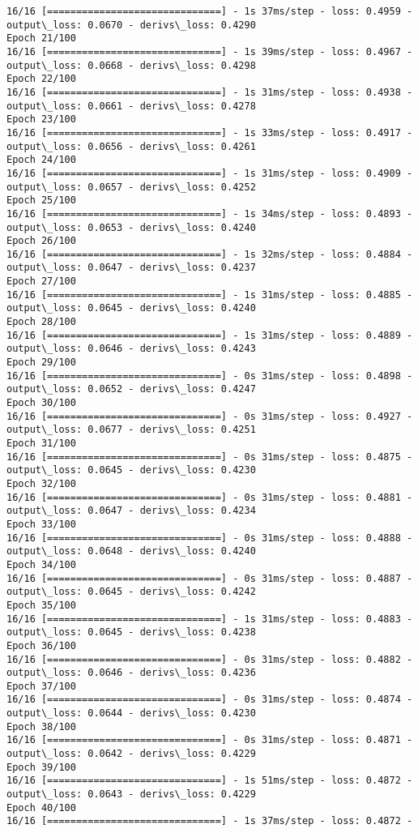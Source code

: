 \documentclass[11pt]{article}
\begin{document}
\begin{Verbatim}[commandchars=\\\{\}]
16/16 [==============================] - 1s 37ms/step - loss: 0.4959 -
output\_loss: 0.0670 - derivs\_loss: 0.4290
Epoch 21/100
16/16 [==============================] - 1s 39ms/step - loss: 0.4967 -
output\_loss: 0.0668 - derivs\_loss: 0.4298
Epoch 22/100
16/16 [==============================] - 1s 31ms/step - loss: 0.4938 -
output\_loss: 0.0661 - derivs\_loss: 0.4278
Epoch 23/100
16/16 [==============================] - 1s 33ms/step - loss: 0.4917 -
output\_loss: 0.0656 - derivs\_loss: 0.4261
Epoch 24/100
16/16 [==============================] - 1s 31ms/step - loss: 0.4909 -
output\_loss: 0.0657 - derivs\_loss: 0.4252
Epoch 25/100
16/16 [==============================] - 1s 34ms/step - loss: 0.4893 -
output\_loss: 0.0653 - derivs\_loss: 0.4240
Epoch 26/100
16/16 [==============================] - 1s 32ms/step - loss: 0.4884 -
output\_loss: 0.0647 - derivs\_loss: 0.4237
Epoch 27/100
16/16 [==============================] - 1s 31ms/step - loss: 0.4885 -
output\_loss: 0.0645 - derivs\_loss: 0.4240
Epoch 28/100
16/16 [==============================] - 1s 31ms/step - loss: 0.4889 -
output\_loss: 0.0646 - derivs\_loss: 0.4243
Epoch 29/100
16/16 [==============================] - 0s 31ms/step - loss: 0.4898 -
output\_loss: 0.0652 - derivs\_loss: 0.4247
Epoch 30/100
16/16 [==============================] - 0s 31ms/step - loss: 0.4927 -
output\_loss: 0.0677 - derivs\_loss: 0.4251
Epoch 31/100
16/16 [==============================] - 0s 31ms/step - loss: 0.4875 -
output\_loss: 0.0645 - derivs\_loss: 0.4230
Epoch 32/100
16/16 [==============================] - 0s 31ms/step - loss: 0.4881 -
output\_loss: 0.0647 - derivs\_loss: 0.4234
Epoch 33/100
16/16 [==============================] - 0s 31ms/step - loss: 0.4888 -
output\_loss: 0.0648 - derivs\_loss: 0.4240
Epoch 34/100
16/16 [==============================] - 0s 31ms/step - loss: 0.4887 -
output\_loss: 0.0645 - derivs\_loss: 0.4242
Epoch 35/100
16/16 [==============================] - 1s 31ms/step - loss: 0.4883 -
output\_loss: 0.0645 - derivs\_loss: 0.4238
Epoch 36/100
16/16 [==============================] - 0s 31ms/step - loss: 0.4882 -
output\_loss: 0.0646 - derivs\_loss: 0.4236
Epoch 37/100
16/16 [==============================] - 0s 31ms/step - loss: 0.4874 -
output\_loss: 0.0644 - derivs\_loss: 0.4230
Epoch 38/100
16/16 [==============================] - 0s 31ms/step - loss: 0.4871 -
output\_loss: 0.0642 - derivs\_loss: 0.4229
Epoch 39/100
16/16 [==============================] - 1s 51ms/step - loss: 0.4872 -
output\_loss: 0.0643 - derivs\_loss: 0.4229
Epoch 40/100
16/16 [==============================] - 1s 37ms/step - loss: 0.4872 -

\end{Verbatim}
\end{document}
